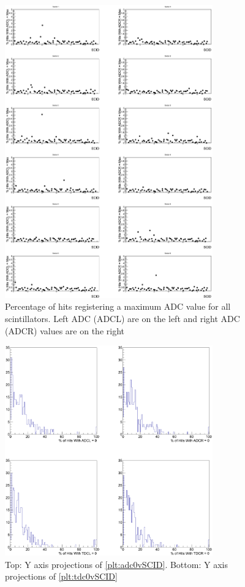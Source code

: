 \begin{figure}
    \includegraphics[width=0.8\textwidth]{figures/calib/tof/tofko/adcMax.eps}
    \caption{Percentage of hits registering a maximum ADC value for all scintillators. Left ADC (ADCL) are on the left and right ADC (ADCR) values are on the right}
    \label{plt:adcMvSCID}
\end{figure}

\begin{figure}
    \includegraphics[width=0.8\textwidth]{figures/calib/tof/tofko/adctdc0perc.eps}
    \caption{Top: Y axis projections of \ref{plt:adc0vSCID}. Bottom: Y axis projections of \ref{plt:tdc0vSCID}}
    \label{plt:proj}
\end{figure}

\FloatBarrier
